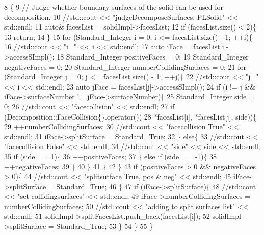 \begin{DoxyCode}
8                                                                      \{
9     \textcolor{comment}{// Judge whether boundary surfaces of the solid can be used for decomposition.}
10     \textcolor{comment}{//std::cout << "judgeDecomposeSurfaces, PLSolid" << std::endl;}
11     \textcolor{keyword}{auto}& facesList = solidImpl->facesList;
12     \textcolor{keywordflow}{if} (facesList.size() < 2)\{
13         \textcolor{keywordflow}{return};
14     \}
15     \textcolor{keywordflow}{for} (Standard\_Integer i = 0; i <= facesList.size() - 1; ++i)\{
16         \textcolor{comment}{//std::cout << "i=" << i << std::endl;}
17         \textcolor{keyword}{auto} iFace = facesList[i]->accessSImpl();
18         Standard\_Integer positiveFaces = 0;
19         Standard\_Integer negativeFaces = 0;
20         Standard\_Integer numberCollidingSurfaces = 0;
21         \textcolor{keywordflow}{for} (Standard\_Integer j = 0; j <= facesList.size() - 1; ++j)\{
22             \textcolor{comment}{//std::cout << "j=" << i << std::endl;}
23             \textcolor{keyword}{auto} jFace = facesList[j]->accessSImpl();
24             \textcolor{keywordflow}{if} (i != j && iFace->surfaceNumber != jFace->surfaceNumber)\{
25                 Standard\_Integer side = 0;
26                 \textcolor{comment}{//std::cout << "facecollision" << std::endl;}
27                 \textcolor{keywordflow}{if} (Decomposition::FaceCollision\{\}.operator()(
28                             *facesList[i], *facesList[j], side))\{
29                     ++numberCollidingSurfaces;
30                     \textcolor{comment}{//std::cout << "facecollision True" << std::endl;}
31                     iFace->splitSurface = Standard\_True;
32                 \} \textcolor{keywordflow}{else}\{
33                     \textcolor{comment}{//std::cout << "facecollision False" << std::endl;}
34                     \textcolor{comment}{//std::cout << "side" << side << std::endl;}
35                     \textcolor{keywordflow}{if} (side == 1)\{
36                         ++positiveFaces;
37                     \} \textcolor{keywordflow}{else} \textcolor{keywordflow}{if} (side == -1)\{
38                         ++negativeFaces;
39                     \}
40                 \}
41             \}
42         \}
43         \textcolor{keywordflow}{if} (positiveFaces > 0 && negativeFaces > 0)\{
44             \textcolor{comment}{//std::cout << "splitsutface True, pos & neg" << std::endl;}
45             iFace->splitSurface = Standard\_True;
46         \}
47         \textcolor{keywordflow}{if} (iFace->splitSurface)\{
48             \textcolor{comment}{//std::cout << "set collidingsurfaces" << std::endl;}
49             iFace->numberCollidingSurfaces = numberCollidingSurfaces;
50             \textcolor{comment}{//std::cout << "adding to split surfaces list" << std::endl;}
51             solidImpl->splitFacesList.push\_back(facesList[i]);
52             solidImpl->splitSurface = Standard\_True;
53         \}
54     \}
55 \}
\end{DoxyCode}
